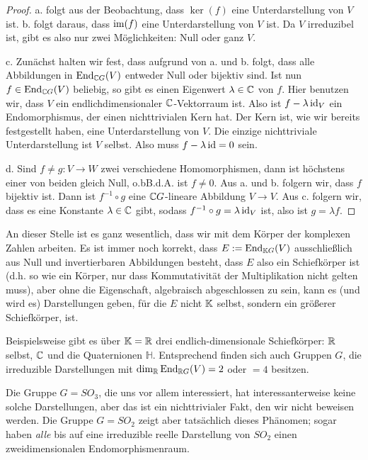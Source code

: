 \begin{proof}
a. folgt aus der Beobachtung, dass $\ker(f)$ eine Unterdarstellung von $V$ ist. b. folgt daraus, dass $\operatorname{im}(f)$ eine Unterdarstellung von $V$ ist. Da $V$ irreduzibel ist, gibt es also nur zwei Möglichkeiten: Null oder ganz $V$.

\smallbreak
c. Zunächst halten wir fest, dass aufgrund von a. und b. folgt, dass alle Abbildungen in $\operatorname{End}_{\mathbb{C} G}(V)$ entweder Null oder bijektiv sind. Ist nun $f\in\operatorname{End}_{\mathbb{C} G}(V)$ beliebig, so gibt es einen Eigenwert $\lambda\in\mathbb{C}$ von $f$. Hier benutzen wir, dass $V$ ein endlichdimensionaler $\mathbb{C}$-Vektorraum ist. Also ist $f-\lambda\operatorname{id}_V$ ein Endomorphismus, der einen nichttrivialen Kern hat. Der Kern ist, wie wir bereits festgestellt haben, eine Unterdarstellung von $V$. Die einzige nichttriviale Unterdarstellung ist $V$ selbst. Also muss $f-\lambda\operatorname{id} = 0$ sein.

\smallbreak
d. Sind $f\neq g: V\to W$ zwei verschiedene Homomorphismen, dann ist höchstens einer von beiden gleich Null, o.bB.d.A. ist $f\neq 0$. Aus a. und b. folgern wir, dass $f$ bijektiv ist. Dann ist $f^{-1}\circ g$ eine $\mathbb{C} G$-lineare Abbildung $V\to V$. Aus c. folgern wir, dass es eine Konstante $\lambda\in\mathbb{C}$ gibt, sodass $f^{-1}\circ g = \lambda\operatorname{id}_V$ ist, also ist $g=\lambda f$.
\end{proof}

\begin{remark}
An dieser Stelle ist es ganz wesentlich, dass wir mit dem Körper der komplexen Zahlen arbeiten. Es ist immer noch korrekt, dass $E:=\operatorname{End}_{\mathbb{K} G}(V)$ ausschließlich aus Null und invertierbaren Abbildungen besteht, dass $E$ also ein Schiefkörper ist (d.h. so wie ein Körper, nur dass Kommutativität der Multiplikation nicht gelten muss), aber ohne die Eigenschaft, algebraisch abgeschlossen zu sein, kann es (und wird es) Darstellungen geben, für die $E$ nicht $\mathbb{K}$ selbst, sondern ein größerer Schiefkörper, ist.

Beispielsweise gibt es über $\mathbb{K}=\mathbb{R}$ drei endlich-dimensionale Schiefkörper: $\mathbb{R}$ selbst, $\mathbb{C}$ und die Quaternionen $\mathbb{H}$. Entsprechend finden sich auch Gruppen $G$, die irreduzible Darstellungen mit $\dim_{\mathbb{R}} \operatorname{End}_{\mathbb{R} G}(V)=2$ oder $=4$ besitzen.

Die Gruppe $G=SO_3$, die uns vor allem interessiert, hat interessanterweise keine solche Darstellungen, aber das ist ein nichttrivialer Fakt, den wir nicht beweisen werden. Die Gruppe $G=SO_2$ zeigt aber tatsächlich dieses Phänomen; sogar haben \emph{alle} bis auf eine irreduzible reelle Darstellung von $SO_2$ einen zweidimensionalen Endomorphismenraum.
\end{remark}

